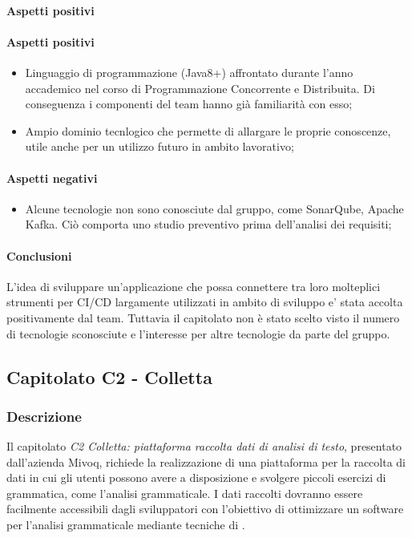 			\paragraph{Aspetti positivi}

			\paragraph{Aspetti positivi} 
				\begin{itemize}
				\item {Linguaggio di programmazione (Java8+) affrontato durante l'anno accademico nel corso di Programmazione Concorrente e Distribuita. Di conseguenza i componenti del team hanno già familiarità con esso;}
				\item{Ampio dominio tecnlogico che permette di allargare le proprie conoscenze, utile anche per un utilizzo futuro in ambito lavorativo;}
			\end{itemize}
			\paragraph{Aspetti negativi}
			\begin{itemize}
				\item {Alcune tecnologie non sono conosciute dal gruppo, come SonarQube, Apache Kafka. Ciò comporta uno studio preventivo prima dell'analisi dei requisiti;}
			\end{itemize} 
			\paragraph{Conclusioni}
			L'idea di sviluppare un'applicazione che possa connettere tra loro molteplici strumenti per CI/CD largamente utilizzati in ambito di sviluppo e' stata accolta positivamente dal team. Tuttavia il capitolato non è stato scelto visto il numero di tecnologie sconosciute e l'interesse per altre tecnologie da parte del gruppo.
			
	\subsection{Capitolato C2 - Colletta}
	\subsubsection{Descrizione}
	Il capitolato \emph{C2 Colletta: piattaforma raccolta dati di analisi di testo}, presentato dall'azienda Mivoq, richiede la realizzazione di una piattaforma per la raccolta di dati in cui gli utenti possono avere a disposizione e svolgere piccoli esercizi di grammatica, come l'analisi grammaticale.
	I dati raccolti dovranno essere facilmente accessibili dagli sviluppatori con l'obiettivo di ottimizzare un software per l'analisi grammaticale mediante tecniche di .   

